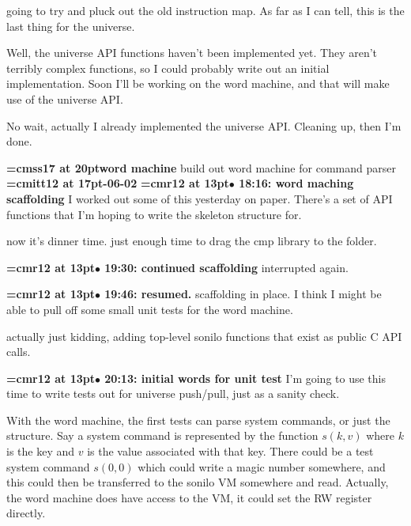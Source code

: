 going to try and pluck out the old instruction map. As far as I can tell, this is the last thing for the universe.
\par

Well, the universe API functions haven't been implemented yet. They aren't terribly complex functions, so I could probably write out an initial implementation. Soon I'll be working on the word machine, and that will make use of the universe API.
\par

No wait, actually I already implemented the universe API. Cleaning up, then I'm done.
\par

{\medskip\noindent\bf\font\titlefont=cmss17 at 20pt\titlefont word machine}\medskip
build out word machine for command parser
{\medskip\noindent\bf\font\titlefont=cmitt12 at 17pt-06-02}\medskip
{\smallskip\noindent\bf\font\titlefont=cmr12 at 13pt\titlefont $\bullet$ 18:16: word maching scaffolding}\smallskip
I worked out some of this yesterday on paper. There's a set of API functions that I'm hoping to write the skeleton structure for.
\par

now it's dinner time. just enough time to drag the cmp library to the folder.
\par

{\smallskip\noindent\bf\font\titlefont=cmr12 at 13pt\titlefont $\bullet$ 19:30: continued scaffolding}\smallskip
interrupted again.
\par

{\smallskip\noindent\bf\font\titlefont=cmr12 at 13pt\titlefont $\bullet$ 19:46: resumed.}\smallskip
scaffolding in place. I think I might be able to pull off some small unit tests for the word machine.
\par

actually just kidding, adding top-level sonilo functions that exist as public C API calls.
\par

{\smallskip\noindent\bf\font\titlefont=cmr12 at 13pt\titlefont $\bullet$ 20:13: initial words for unit test}\smallskip
I'm going to use this time to write tests out for universe push/pull, just as a sanity check.
\par

With the word machine, the first tests can parse system commands, or just the structure. Say a system command is represented by the function $s(k,v)$ where $k$ is the key and $v$ is the value associated with that key. There could be a test system command $s(0, 0)$ which could write a magic number somewhere, and this could then be transferred to the sonilo VM somewhere and read. Actually, the word machine does have access to the VM, it could set the RW register directly.
\par

